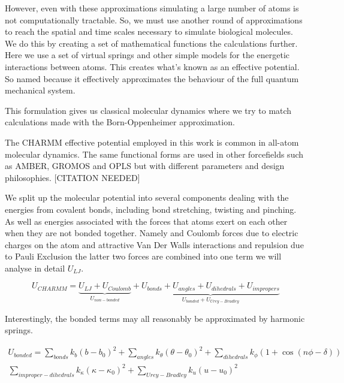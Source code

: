 However, even with these approximations simulating a large number of atoms is not computationally tractable. So, we must use another round of approximations to reach the spatial and time scales necessary to simulate biological molecules. We do this by creating a set of mathematical functions the calculations further. Here we use a set of virtual springs and other simple models for the energetic interactions between atoms. This creates what's known as an effective potential. So named because it effectively approximates the behaviour of the full quantum mechanical system.

This formulation gives us classical molecular dynamics where we try to match calculations made with the Born-Oppenheimer approximation. 

The CHARMM effective potential employed in this work is common in all-atom molecular dynamics. The same  functional forms are used in other forcefields such as AMBER, GROMOS and OPLS but with different parameters and design philosophies. [CITATION NEEDED]

We split up the molecular potential into several components dealing with the energies from covalent bonds, including bond stretching, twisting and pinching. As well as energies associated with the forces that atoms exert on each other when they are not bonded together. Namely and Coulomb forces due to electric charges on the atom and attractive Van Der Walls interactions and repulsion due to Pauli Exclusion the latter two forces are combined into one term we will analyse in detail $U_{LJ}$.

\begin{equation}
	U_{CHARMM} = \underbrace{U_{LJ} + U_{Coulomb}}_{U_{non-bonded}} + \underbrace{U_{bonds} + U_{angles} + U_{dihedrals} + U_{impropers}}_{U_{bonded} + U_{Urey-Bradley}}
\end{equation}

Interestingly, the bonded terms may all reasonably be approximated by harmonic springs. 

\begin{equation}\label{bonded_eqs}
	\begin{aligned}
	U_{bonded} = \sum_{bonds} k_{b} (b-b_0)^2 + \sum_{angles} k_\theta(\theta-\theta_0)^2 + \sum_{dihedrals} k_\phi (1+\cos(n \phi - \delta)) \\ \sum_{improper-dihedrals}  k_{\kappa} (\kappa - \kappa_0)^2 + \sum_{Urey-Bradley} k_u(u-u_0)^2 
\end{aligned}
\end{equation}

